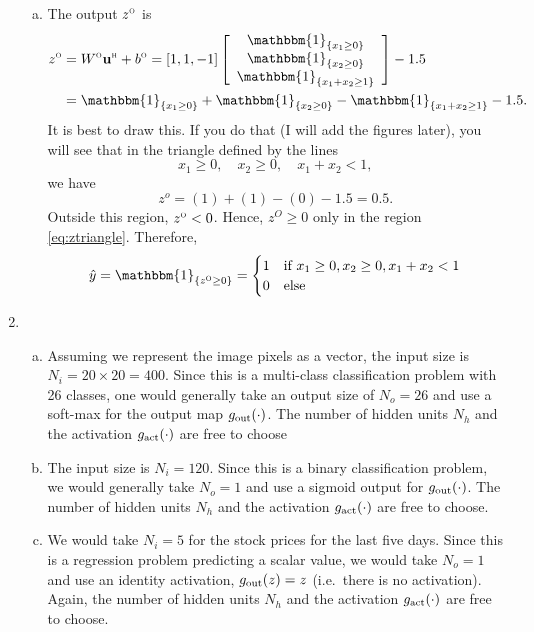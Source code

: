 \documentclass[11pt]{article}
\def\beq{\begin{equation}}
\def\eeq{\end{equation}}
\def\x{\times}
\newcommand{\ubf}{\mathbf{u}}
\newcommand{\indic}[1]{\mathbbm{1}_{ \{ {#1} \} }}
\def\hid{\textsc{\tiny H}}
\def\out{\textsc{\tiny O}}
\begin{document}
\begin{enumerate}
\begin{enumerate}[(a)]
\item The output $z^\out$ is
\begin{align*}
    z^\out &= W^\out \ubf^\hid + b^\out =
    [1, 1, -1]
    \left[ \begin{array}{c} \indic{x_1 \geq 0} \\ \indic{x_2 \geq 0}
    \\  \indic{x_1+x_2 \geq 1} \end{array} \right]
    - 1.5 \\
    &= \indic{x_1 \geq 0} + \indic{x_2 \geq 0} -\indic{x_1 + x_2 \geq 1} - 1.5.
\end{align*}
It is best to draw this.  If you do that (I will add the figures later),
you will see that in the triangle defined by the lines
\beq \label{eq:ztriangle}
    x_1 \geq 0, \quad x_2 \geq 0, \quad  x_1 + x_2 < 1,
\eeq
we have
\[
    z^o = (1) + (1) -(0)-1.5 = 0.5.
\]
Outside this region, $z^\out < 0$.  Hence, $z^O \geq 0$ only in the region
\eqref{eq:ztriangle}.  Therefore,
\[
    \hat{y} = \indic{z^\out \geq 0} =
    \begin{cases}
        1 & \mbox{if } x_1 \geq 0, x_2 \geq 0, x_1 + x_2 < 1 \\
        0 & \mbox{else}
     \end{cases}
\]

\end{enumerate}

\item 
\begin{enumerate}[(a)]
\item Assuming we represent the image pixels as a vector,
the input size is $N_i=20\x20=400$.  Since this is a multi-class classification problem
with 26 classes, one would generally take an output size of $N_o=26$ and use a soft-max for
the output map $g_{\rm out}(\cdot)$.    The number of hidden units $N_h$
and the activation $g_{\rm act}(\cdot)$ are free to choose

\item The input size is $N_i=120$. Since this is a binary classification problem,
we would generally take $N_o=1$ and use a sigmoid output for 
$g_{\rm out}(\cdot)$.    The number of hidden units $N_h$
and the activation $g_{\rm act}(\cdot)$ are free to choose.

\item We would take $N_i=5$ for the stock prices for the last five days.
Since this is a regression problem predicting a scalar value, we would take
$N_o=1$ and use an identity activation, $g_{\rm out}(z)=z$ (i.e.\ there is 
no activation).
Again, the number of hidden units $N_h$
and the activation $g_{\rm act}(\cdot)$ are free to choose.
\end{enumerate}


\end{enumerate}
\end{document}
